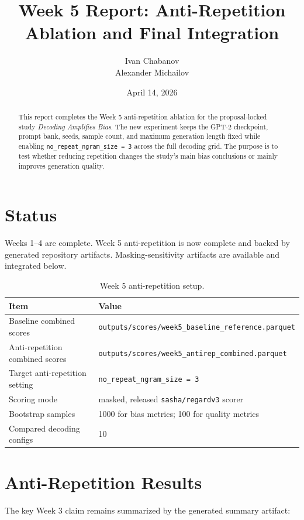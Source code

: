 \documentclass[11pt]{article}
\title{Week 5 Report: Anti-Repetition Ablation and Final Integration}
\author{Ivan Chabanov \\ Alexander Michailov}
\date{April 14, 2026}
\begin{document}
\maketitle

\begin{abstract}
This report completes the Week 5 anti-repetition ablation for the proposal-locked study
\textit{Decoding Amplifies Bias}. The new experiment keeps the GPT-2 checkpoint, prompt bank,
seeds, sample count, and maximum generation length fixed while enabling
\texttt{no\_repeat\_ngram\_size = 3} across the full decoding grid. The purpose is to test
whether reducing repetition changes the study's main bias conclusions or mainly improves generation
quality.
\end{abstract}

\section{Status}
Weeks 1--4 are complete. Week 5 anti-repetition is now complete and backed by generated repository
artifacts. Masking-sensitivity artifacts are available and integrated below.

\begin{table}[t]
\centering
\small
\begin{tabularx}{\linewidth}{@{}lX@{}}
\toprule
Item & Value \\
\midrule
Baseline combined scores & \texttt{outputs/scores/week5\_baseline\_reference.parquet} \\
Anti-repetition combined scores & \texttt{outputs/scores/week5\_antirep\_combined.parquet} \\
Target anti-repetition setting & \texttt{no\_repeat\_ngram\_size = 3} \\
Scoring mode & masked, released \texttt{sasha/regardv3} scorer \\
Bootstrap samples & 1000 for bias metrics; 100 for quality metrics \\
Compared decoding configs & 10 \\
\bottomrule
\end{tabularx}
\caption{Week 5 anti-repetition setup.}
\end{table}

\section{Anti-Repetition Results}
The key Week 3 claim remains summarized by the generated summary artifact:
\end{document}
